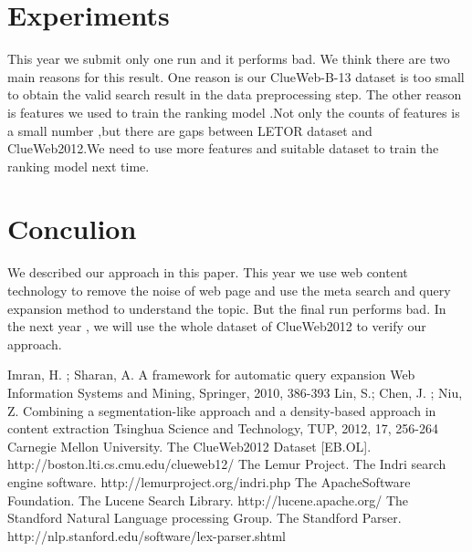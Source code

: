 \documentclass[runningheads,a4paper]{llncs}
\begin{document}
\section{Experiments}

This year we submit only one run and it performs bad. We think there are two main reasons for this result. One reason is our ClueWeb-B-13 dataset is too small to obtain the valid search result in the data preprocessing step. The other reason is features we used to train the ranking model .Not only the counts of features is a small number ,but there are gaps between LETOR dataset and ClueWeb2012.We need to use more features and suitable dataset to train the ranking model next time.

\section{Conculion}

We described our approach in this paper. This year we use web content technology to remove the noise of web page and use the meta search and query expansion method to understand the topic. But the final run performs bad. In the next year , we will use the whole dataset of ClueWeb2012 to verify our approach.


\begin{thebibliography}{4}
Imran, H. ; Sharan, A. A framework for automatic query expansion Web Information Systems and Mining, Springer, 2010, 386-393
Lin, S.; Chen, J. ; Niu, Z. Combining a segmentation-like approach and a density-based approach in content extraction Tsinghua Science and Technology, TUP, 2012, 17, 256-264
 Carnegie Mellon University. The ClueWeb2012 Dataset [EB.OL]. http://boston.lti.cs.cmu.edu/clueweb12/
 The Lemur Project. The Indri search engine software. http://lemurproject.org/indri.php
 The ApacheSoftware Foundation. The Lucene Search Library. http://lucene.apache.org/
 The Standford Natural Language processing Group. The Standford Parser. http://nlp.stanford.edu/software/lex-parser.shtml
\end{thebibliography}
\end{document}
